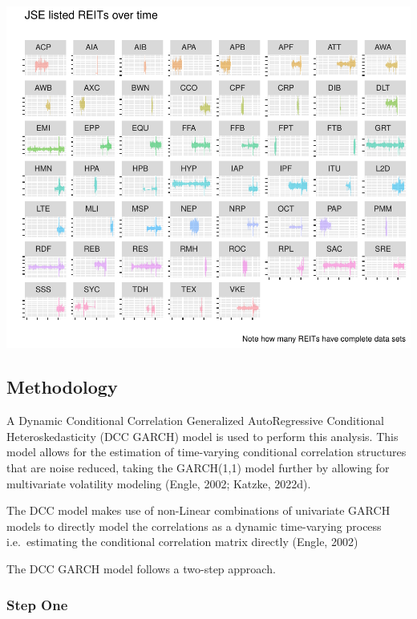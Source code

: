 \documentclass[11pt,preprint, authoryear]{elsarticle}
\let\origfigure\figure
\let\endorigfigure\endfigure
\renewenvironment{figure}[1][2] {
    \expandafter\origfigure\expandafter[H]
} {
    \endorigfigure
}
\numberwithin{equation}{section}
\numberwithin{figure}{section}
\numberwithin{table}{section}
\begin{document}
\begin{figure}
\centering
\includegraphics{Fin_Metrics_Project_files/figure-latex/unnamed-chunk-1-1.pdf}
\caption{REITs Dataset}
\end{figure}

\hypertarget{methodology}{%
\subsection{Methodology}\label{methodology}}

A Dynamic Conditional Correlation Generalized AutoRegressive Conditional
Heteroskedasticity (DCC GARCH) model is used to perform this analysis.
This model allows for the estimation of time-varying conditional
correlation structures that are noise reduced, taking the GARCH(1,1)
model further by allowing for multivariate volatility modeling (Engle,
2002; Katzke, 2022d).

The DCC model makes use of non-Linear combinations of univariate GARCH
models to directly model the correlations as a dynamic time-varying
process i.e.~estimating the conditional correlation matrix directly
(Engle, 2002)

The DCC GARCH model follows a two-step approach.

\hypertarget{step-one}{%
\subsubsection{Step One}\label{step-one}}
\end{document}
